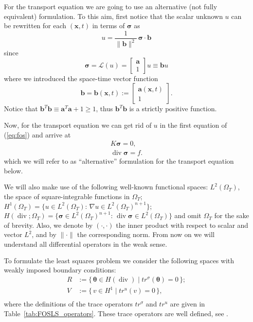\documentclass[a4paper,12pt]{amsart}
\numberwithin{equation}{section}
\renewcommand{\div}{\operatorname{div}}
\def\bu{{\mathbf a}} %
\def\bb{{\mathbf b}}
\renewcommand{\L}{{\mathcal L}}
\def\XVec#1{{\mathbf #1}}
\def\Xx{\XVec{x}}
\def\btheta{{\boldsymbol \theta}}
\def\bsigma{{\boldsymbol \sigma}}
\begin{document}
For the transport equation we are going to use an alternative (not fully equivalent) formulation. To this aim, first notice that the scalar unknown $u$ can be rewritten  for each $(\Xx,t)$ in terms of $\bsigma$ as
$$
u = \frac{1}{\| \bb \|^2 } \, \bsigma \cdot \bb
$$
since
$$
\bsigma = \L(u) = \left[ \begin{array}{c} \bu \\ 1 \end{array} \right] u \equiv \bb u
$$
where we introduced the space-time vector function
\[
\bb = \bb(\Xx,t) := \begin{bmatrix} \bu(\Xx,t) \\ 1 \end{bmatrix}.
\]
Notice that $\bb^T\bb \equiv \bu^T\bu+1 \ge 1$, thus $\bb^T\bb$ is a strictly positive function.

Now, for the transport equation we can get rid of $u$ in the first equation of (\eqref{eq:fos}) and arrive at
\begin{equation}
\begin{array}{c}
K \bsigma = 0,  \\ 
\div \bsigma = f. 
\end{array}
\label{eq:alt_fos} 
\end{equation}
which we will refer to as ``alternative'' formulation for the transport equation below.

We will also make use of the following well-known functional spaces: $L^2(\Omega_T)$, the space of square-integrable functions in $\Omega_T$; $H^1(\Omega_T) = \{ u \in L^2(\Omega_T) : \, \nabla u \in L^2(\Omega_T)^{n+1} \} $; $H(\div; \Omega_T) = \{ \bsigma \in L^2(\Omega_T)^{n+1} : \, \div \bsigma \in L^2(\Omega_T) \}$ and omit $\Omega_T$ for the sake of brevity. Also, we denote by  $(\cdot,\cdot)$ the inner product with respect to scalar and vector $L^2$, and by $\|\cdot \|$ the corresponding norm. From now on we will understand all differential operators in the weak sense. %

To formulate the least squares problem  we  consider the following spaces with weakly imposed boundary conditions:
\begin{equation}
\begin{split}
R & := \{\,\btheta \in H(\div) \;|\; tr^\sigma(\btheta) = 0\,\};\\
V & := \{\,v \in H^1 \;|\; tr^u(v) = 0\,\},\\
\end{split}
\label{eq:spaces}
\end{equation}
where the definitions of the trace operators $tr^{\sigma}$ and $tr^u$ are given in Table~\ref{tab:FOSLS_operators}. These trace operators are well defined, see \cite{gatica}. 
\end{document}
